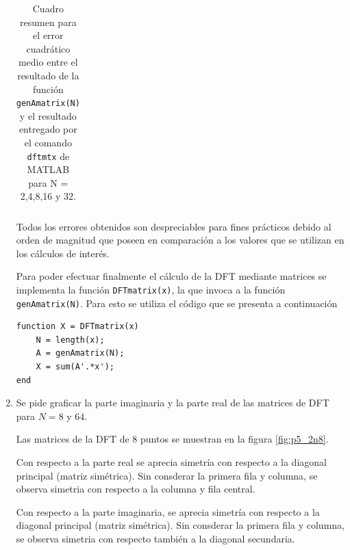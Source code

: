 \begin{enumerate}
\begin{table}[H]
\begin{tabular}{|c|c|}
        \end{tabular}
        \caption{Cuadro resumen para el error cuadrático medio entre el resultado de la función \texttt{genAmatrix(N)} y el resultado entregado por el comando \texttt{dftmtx} de MATLAB para N = 2,4,8,16 y 32.}
        \label{MSE_Amatrix}
    \end{table}
    
    
    Todos los errores obtenidos son despreciables para fines prácticos debido al orden de magnitud que poseen en comparación a los valores que se utilizan en los cálculos de interés.
    
    Para poder efectuar finalmente el cálculo de la DFT mediante matrices se implementa la función \texttt{DFTmatrix(x)}, la que invoca a la función \texttt{genAmatrix(N)}. Para esto se utiliza el código que se presenta a continuación
    
    \begin{lstlisting}
function X = DFTmatrix(x)
    N = length(x);
    A = genAmatrix(N);
    X = sum(A'.*x');
end

    \end{lstlisting}
    
    \item Se pide graficar la parte imaginaria y la parte real de las matrices de DFT para $N = 8$ y $64$.
    
    Las matrices de la DFT de 8 puntos se muestran en la figura \ref{fig:p5_2n8}.
    
    Con respecto a la parte real se aprecia simetría con respecto a la diagonal principal (matriz simétrica). Sin consderar la primera fila y columna, se observa simetria con respecto a la columna y fila central.
    
    Con respecto a la parte imaginaria, se aprecia simetría con respecto a la diagonal principal (matriz simétrica). Sin consderar la primera fila y columna, se observa simetria con respecto también a la diagonal secundaria.
    

\end{enumerate}
